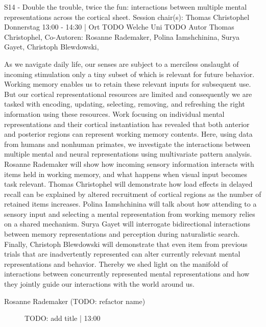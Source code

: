 
            \begin{symposium}
            {S14 - Double the trouble, twice the fun: interactions between multiple mental representations across the cortical sheet.}
            {Session chair(s): Thomas Christophel}
            {Donnerstag 13:00 - 14:30 | Ort TODO}
            {Welche Uni TODO}
            Autor Thomas Christophel, Co-Autoren: Rosanne Rademaker, Polina Iamshchinina, Surya Gayet, Christoph Blewdowski, 

As we navigate daily life, our senses are subject to a merciless onslaught of incoming stimulation only a tiny subset of which is relevant for future behavior. Working memory enables us to retain these relevant inputs for subsequent use. But our cortical representational resources are limited and consequently we are tasked with encoding, updating, selecting, removing, and refreshing the right information using these resources. Work focusing on individual mental representations and their cortical instantiation has revealed that both anterior and posterior regions can represent working memory contents. Here, using data from humans and nonhuman primates, we investigate the interactions between multiple mental and neural representations using multivariate pattern analysis. Rosanne Rademaker will show how incoming sensory information interacts with items held in working memory, and what happens when visual input becomes task relevant. Thomas Christophel will demonstrate how load effects in delayed recall can be explained by altered recruitment of cortical regions as the number of retained items increases. Polina Iamshchinina will talk about how attending to a sensory input and selecting a mental representation from working memory relies on a shared mechanism. Surya Gayet will interrogate bidirectional interactions between memory representations and perception during naturalistic search. Finally, Christoph Blewdowski will demonstrate that even item from previous trials that are inadvertently represented can alter currently relevant mental representations and behavior. Thereby we shed light on the manifold of interactions between concurrently represented mental representations and how they jointly guide our interactions with the world around us.
            \begin{description}    
            
                \item [Rosanne Rademaker  (TODO: refactor name)] TODO: add title \textcolor{mygray}{ | 13:00}    
                

\end{description}
\end{symposium}
